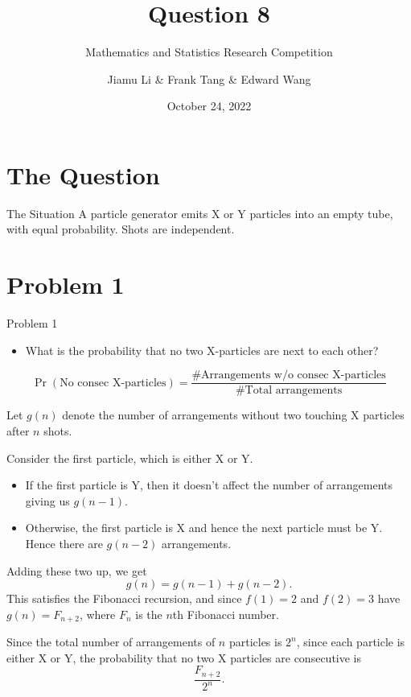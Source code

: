 \documentclass[xcolor={usenames,dvipsnames}]{beamer}
\title{Question 8}
\subtitle{Mathematics and Statistics Research Competition}
\author{Jiamu Li \& Frank Tang \& Edward Wang}
\institute{Scotch College}
\date{October 24, 2022}
\DeclareMathOperator{\prob}{Pr}
\begin{document}
\begin{frame}
  \titlepage
\end{frame}


\section{The Question}
\begin{frame}{The Situation}
  A particle generator emits X or Y particles into an empty tube, with equal probability. Shots are independent.
  \begin{center}
    
  \end{center}
\end{frame}
\section{Problem 1}
\begin{frame}{Problem 1}
\begin{itemize}
  \item What is the probability that no two X-particles are next to each other?
\end{itemize}

\begin{equation*}
  \prob(\text{No consec X-particles}) = \frac{\# \text{Arrangements w/o consec X-particles}}{\# \text{Total arrangements}}
\end{equation*}

\end{frame}

\begin{frame}
  Let $g(n)$ denote the number of arrangements without two touching X particles after  $n $ shots.
  
  Consider the first particle, which is either X or Y.
  \begin{itemize}
    \item If the first particle is Y, then it doesn't affect the number of arrangements giving us $g(n-1)$.
    \item Otherwise, the first particle is X and hence the next particle must be Y. Hence there are  $g(n-2)$ arrangements.
  \end{itemize}
\end{frame}
\begin{frame}
  Adding these two up, we get  \[
    g(n) = g(n-1) + g(n-2)
  .\] This satisfies the Fibonacci recursion, and since $f(1) = 2$ and $f(2) = 3$ have $g(n) = F_{n+2}$, where $F_n$ is the $n$th Fibonacci number.

  Since the total number of arrangements of $n$ particles is $2^{n}$, since each particle is either X or Y, the probability that no two X particles are consecutive is \[
    \frac{F_{n+2}}{2^n}
  .\] 
\end{frame}
\end{document}
